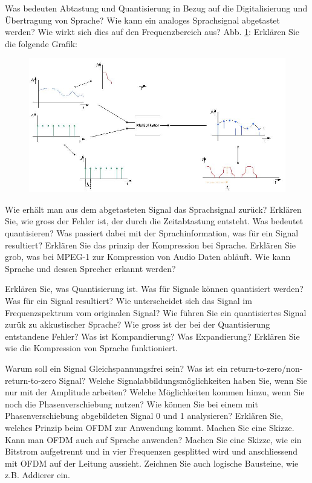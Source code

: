 \documentclass[ngerman,a4paper,12pt]{scrreprt}
\begin{document}
\olR
	\li Was bedeuten Abtastung und Quantisierung in Bezug auf die Digitalisierung und Übertragung von Sprache?
	\li Wie kann ein analoges Sprachsignal abgetastet werden? Wie wirkt sich dies auf den Frequenzbereich aus?
	\li Abb. \ref{zeitdiskret}: Erklären Sie die folgende Grafik:
	\begin{figure}[H]
		\centering
		\includegraphics[width=\textwidth]{img/R10.1.jpg}
		\caption{}
		\label{zeitdiskret}
	\end{figure}
	\li Wie erhält man aus dem abgetasteten Signal das Sprachsignal zurück?
	\li Erklären Sie, wie gross der Fehler ist, der durch die Zeitabtastung entsteht.
	\li Was bedeutet quantisieren? Was passiert dabei mit der Sprachinformation, was für ein Signal resultiert?
	\li Erklären Sie das prinzip der Kompression bei Sprache.
	\li Erklären Sie grob, was bei MPEG-1 zur Kompression von Audio Daten abläuft.
	\li Wie kann Sprache und dessen Sprecher erkannt werden?
\olS

\olR
	\li Erklären Sie, was Quantisierung ist. Was für Signale können quantisiert werden?
	\li Was für ein Signal resultiert? Wie unterscheidet sich das Signal im Frequenzspektrum vom originalen Signal?
	\li Wie führen Sie ein quantisiertes Signal zurük zu akkustischer Sprache?
	\li Wie gross ist der bei der Quantisierung entstandene Fehler?
	\li Was ist Kompandierung? Was Expandierung? Erklären Sie wie die Kompression von Sprache funktioniert.
\olS

\olR
	\li Warum soll ein Signal Gleichspannungsfrei sein?
	\li Was ist ein return-to-zero/non-return-to-zero Signal?
	\li Welche Signalabbildungsmöglichkeiten haben Sie, wenn Sie nur mit der Amplitude arbeiten? Welche Möglichkeiten kommen hinzu, wenn Sie noch die Phasenverschiebung nutzen?
	\li Wie können Sie bei einem mit Phasenverschiebung abgebildeten Signal 0 und 1 analysieren?
	\li Erklären Sie, welches Prinzip beim OFDM zur Anwendung kommt. Machen Sie eine Skizze. Kann man OFDM auch auf Sprache anwenden?	
	\li Machen Sie eine Skizze, wie ein Bitstrom  aufgetrennt und in vier Frequenzen gesplitted wird und anschliessend mit OFDM auf der Leitung aussieht. Zeichnen Sie auch logische Bausteine, wie z.B. Addierer ein.
\olS
\end{document}
